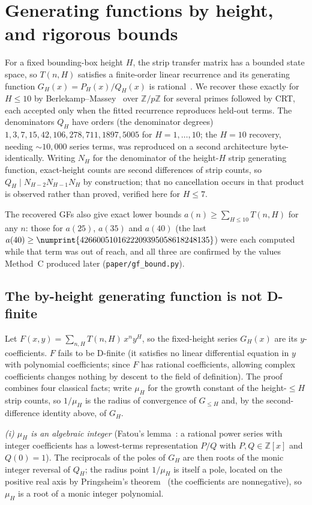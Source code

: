 \documentclass[11pt]{article}
\newcommand{\num}[1]{\numprint{#1}}
\begin{document}
\section{Generating functions by height, and rigorous bounds}
\label{sec:gf}

For a fixed bounding-box height $H$, the strip transfer matrix has a bounded
state space, so $T(n,H)$ satisfies a finite-order linear recurrence and its
generating function $G_H(x)=P_H(x)/Q_H(x)$ is rational~\cite{stanley}. We
recover these exactly for $H\le10$ by Berlekamp--Massey~\cite{massey} over
$\mathbb{Z}/p\mathbb{Z}$ for several primes followed by CRT, each accepted
only when the fitted recurrence reproduces held-out terms. The denominators
$Q_H$ have orders (the denominator degrees)
$1,3,7,15,42,106,278,711,1897,5005$ for
$H=1,\dots,10$; the $H=10$ recovery, needing $\sim\!10{,}000$ series terms,
was reproduced on a second architecture byte-identically. Writing $N_H$ for
the denominator of the height-$H$ strip generating function, exact-height
counts are second differences of strip counts, so
$Q_H \mid N_{H-2}N_{H-1}N_H$ by construction; that no cancellation occurs in
that product is observed rather than proved, verified here for $H\le7$.

The recovered GFs also give exact lower bounds $a(n)\ge\sum_{H\le10}T(n,H)$
for any $n$: those for $a(25)$, $a(35)$ and $a(40)$ (the last
$a(40)\ge\num{4266005101622209395058618248135}$) were each computed while
that term was out of reach, and all three are confirmed by the values
Method~C produced later (\texttt{paper/gf\_bound.py}).

\subsection{The by-height generating function is not D-finite}
\label{sec:notdfinite}

Let $F(x,y)=\sum_{n,H} T(n,H)\,x^n y^H$, so the fixed-height series
$G_H(x)$ are its $y$-coefficients. $F$ fails to be D-finite (it satisfies
no linear differential equation in $y$ with polynomial coefficients; since
$F$ has rational coefficients, allowing complex coefficients changes
nothing by descent to the field of definition). The proof combines four
classical facts; write $\mu_H$ for the growth constant of the height-$\le H$ strip counts,
so $1/\mu_H$ is the radius of convergence of $G_{\le H}$ and, by the
second-difference identity above, of $G_H$.

\emph{(i) $\mu_H$ is an algebraic integer} (Fatou's lemma~\cite{fatou}: a
rational power series with integer coefficients has a lowest-terms
representation $P/Q$ with $P,Q\in\mathbb Z[x]$ and $Q(0)=1$). The
reciprocals of the poles of $G_H$ are then roots of the monic integer
reversal of $Q_H$; the radius point $1/\mu_H$ is itself a pole, located on
the positive real axis by Pringsheim's theorem~\cite{flajolet} (the
coefficients are nonnegative), so $\mu_H$ is a root of a monic integer
polynomial.
\end{document}
